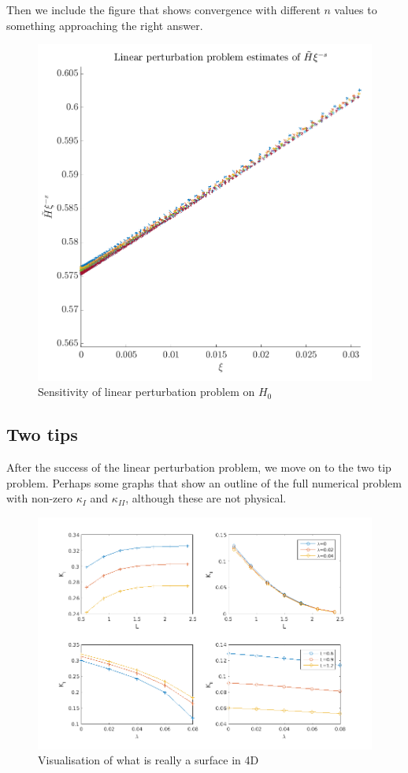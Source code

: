 \documentclass{jfm}
\begin{document}
Then we include the figure that shows convergence with different $n$ values
to something approaching the right answer.
\begin{figure}
 \centerline{
\includegraphics[scale=0.2]{./../../Graphs/linear-perturbation-plot.png}}
  \caption{Sensitivity of linear perturbation problem on $H_0$}
\end{figure}

\subsection{Two tips}
After the success of the linear perturbation problem, we move on to the two tip
problem. Perhaps some graphs that show an outline of the full numerical problem
with non-zero $\kappa_I$ and $\kappa_{II}$, although these are not physical.
\begin{figure}
 \centerline{
\includegraphics[scale=0.3]{./../../Graphs/KI-KII.png}}
  \caption{Visualisation of what is really a surface in 4D}
\end{figure}
\end{document}
